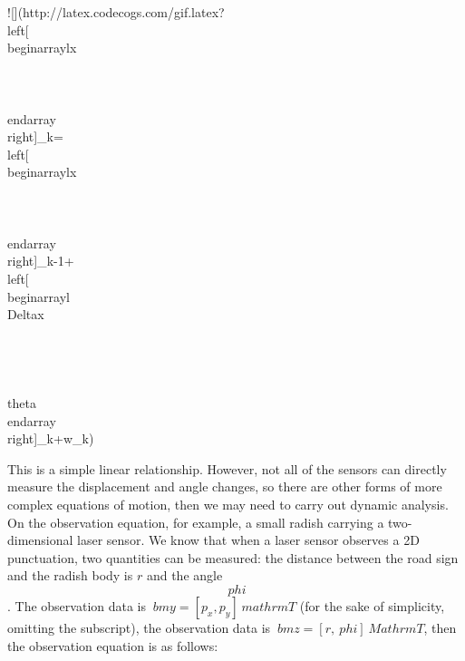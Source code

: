 ![](http://latex.codecogs.com/gif.latex?{\\left[\\begin{array}{l}x\\\y\\\\\theta\\end{array}\\right]_k}={\\left[\\begin{array}{l}x\\\y\\\\\theta\\end{array}\\right]_{k-1}}+{\\left[\\begin{array}{l}\\Delta{x}\\\\\\\\\Delta\\theta\\end{array}\\right]_k}+w_k)

This is a simple linear relationship. However, not all of the sensors can directly measure the displacement and angle changes, so there are other forms of more complex equations of motion, then we may need to carry out dynamic analysis. On the observation equation, for example, a small radish carrying a two-dimensional laser sensor. We know that when a laser sensor observes a 2D punctuation, two quantities can be measured: the distance between the road sign and the radish body is $ r $ and the angle $$ \ phi $$. The observation data is $ \ bm {y} = [p_x, p_y] ^ \ mathrm {T} $ (for the sake of simplicity, omitting the subscript), the observation data is $ \ bm {z} = [r, \ phi] ^ \ Mathrm {T} $, then the observation equation is as follows: